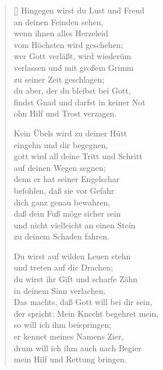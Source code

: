 \begin{multicols}{2}
\begin{verse}[\versewidth]
 Hingegen wirst du Lust und Freud\\
an deinen Feinden sehen,\\
wenn ihnen alles Herzeleid\\
vom Höchsten wird geschehen;\\
wer Gott verläßt, wird wiederüm\\
verlassen und mit großem Grimm\\
zu seiner Zeit geschlagen;\\
du aber, der du bleibst bei Gott,\\
findst Gnad und darfst in keiner Not\\
ohn Hilf und Trost verzagen.

 Kein Übels wird zu deiner Hütt\\
eingehn und dir begegnen,\\
gott wird all deine Tritt und Schritt\\
auf deinen Wegen segnen;\\
denn er hat seiner Engelschar\\
befohlen, daß sie vor Gefahr\\
dich ganz genau bewahren,\\
daß dein Fuß möge sicher sein\\
und nicht vielleicht an einen Stein\\
zu deinem Schaden fahren.

 Du wirst auf wilden Leuen stehn\\
und treten auf die Drachen;\\
du wirst ihr Gift und scharfe Zähn\\
in deinem Sinn verlachen.\\
Das machts, daß Gott will bei dir sein,\\
der spricht: Mein Knecht begehret mein,\\
so will ich ihm beispringen;\\
er kennet meines Namens Zier,\\
drum will ich ihm auch nach Begier\\
mein Hilf und Rettung bringen.

\end{verse}
\end{multicols}


